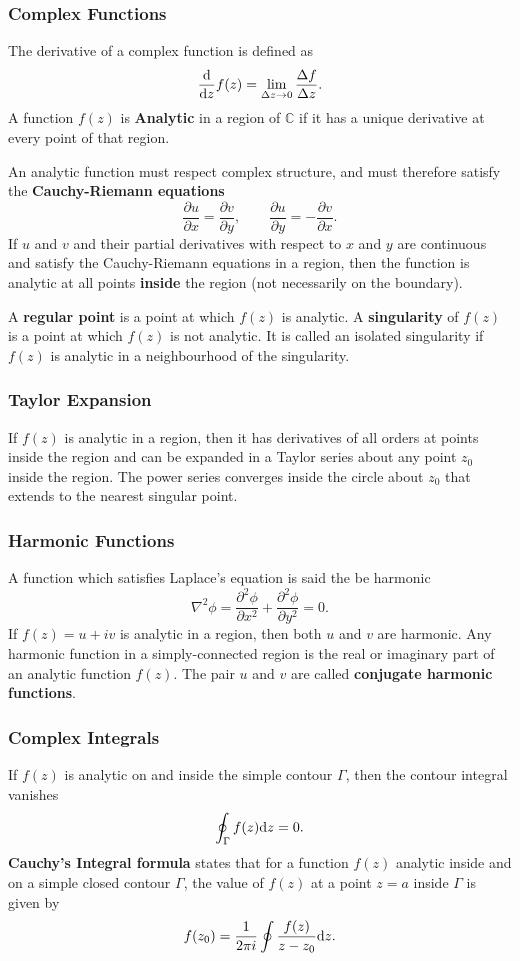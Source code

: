 \documentclass[a4paper,10pt,twoside,twocolumn]{article}
\renewcommand{\(}{\left(}
\renewcommand{\)}{\right)}
\renewcommand{\d}{\mathrm d}
\renewcommand{\d}{{\rm d}}
\newcommand{\header}[1]{\subsubsection*{#1} \vspace{-0.2cm}}
\begin{document}
\header{Complex Functions}
The derivative of a complex function is defined as
$$\frac{\d}{\d z} f(z) = \lim_{\Delta z\to 0} \frac{\Delta f}{\Delta z}.$$
A function $f(z)$ is \textbf{Analytic} in a region of $\mathbb{C}$ if it has a unique derivative at every point of that region.

An analytic function must respect complex structure, and must therefore satisfy the \textbf{Cauchy-Riemann equations}
$$\frac{\partial u}{\partial x} = \frac{\partial v}{\partial y}, \qquad \frac{\partial u}{\partial y} = -\frac{\partial v}{\partial x}.$$
If $u$ and $v$ and their partial derivatives with respect to $x$ and $y$ are continuous and satisfy the Cauchy-Riemann equations in a region, then the function is analytic at all points \textbf{inside} the region (not necessarily on the boundary).

A \textbf{regular point} is a point at which $f(z)$ is analytic. A \textbf{singularity} of $f(z)$ is a point at which $f(z)$ is not analytic. It is called an isolated singularity if $f(z)$ is analytic in a neighbourhood of the singularity.


\header{Taylor Expansion}
If $f(z)$ is analytic in a region, then it has derivatives of all orders at points inside the region and can be expanded in a Taylor series about any point $z_0$ inside the region. The power series converges inside the circle about $z_0$ that extends to the nearest singular point.

\header{Harmonic Functions}
A function which satisfies Laplace's equation is said the be harmonic
$$\nabla^2 \phi = \frac{\partial^2 \phi}{\partial x^2} + \frac{\partial^2 \phi}{\partial y^2} = 0.$$
If $f(z) = u + iv$ is analytic in a region, then both $u$ and $v$ are harmonic. Any harmonic function in a simply-connected region is the real or imaginary part of an analytic function $f(z)$. The pair $u$ and $v$ are called \textbf{conjugate harmonic functions}.

\header{Complex Integrals}
If $f(z)$ is analytic on and inside the simple contour $\Gamma$, then the contour integral vanishes
$$\oint_\Gamma f(z) \d z = 0.$$
\textbf{Cauchy's Integral formula} states that for a function $f(z)$ analytic inside and on a simple closed contour $\Gamma$, the value of $f(z)$ at a point $z=a$ inside $\Gamma$ is given by
$$f(z_0) = \frac{1}{2\pi i} \oint \frac{f(z)}{z-z_0}\d z.$$
\end{document}
